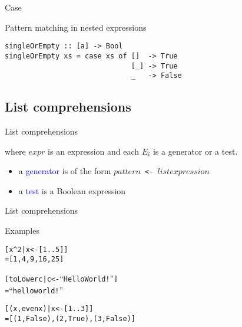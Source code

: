 \documentclass{beamer}
\def\code#1{\texttt{\frenchspacing#1}}
\begin{document}
\begin{frame}[fragile]{Case}

Pattern matching in nested expressions

\begin{verbatim}
singleOrEmpty :: [a] -> Bool
singleOrEmpty xs = case xs of []  -> True
                              [_] -> True
                              _   -> False
\end{verbatim}

\end{frame}

\subsection{List comprehensions}

\begin{frame}{List comprehensions}

\begin{block}{\centering \code{[ $expr$ | $E_1$, ..., $E_n$ ]}}
\end{block}

where $expr$ is an expression and each $E_i$ is a generator or a test.

\pause

\begin{itemize}
    \item a \textcolor{blue}{generator} is of the form \code{$pattern$ <- $list expression$}\pause
    \item a \textcolor{blue}{test} is a Boolean expression
\end{itemize}

\end{frame}

\begin{frame}[fragile]{List comprehensions}

\begin{exampleblock}{Examples}
\begin{alltt}
[x ^ 2 | x <- [1..5]]\pause
= [1, 4, 9, 16, 25]

[toLower c | c <- “Hello World!”]\pause
= “hello world!”

[(x, even x) | x <- [1..3]]\pause
= [(1, False), (2, True), (3, False)]
\end{alltt}
\end{exampleblock}

\end{frame}
\end{document}
